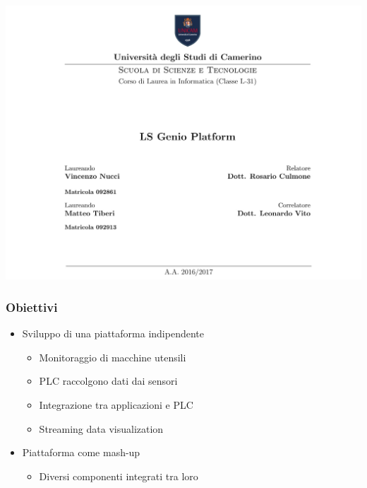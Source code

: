\documentclass{beamer}
\date{}
\begin{document}
	
	\begin{frame}
	\centering
	\includegraphics[scale=0.25]{images/frontespizio-beamer.png}\par
\end{frame}

\begin{frame}
\frametitle{Obiettivi}
\begin{itemize}
	\item Sviluppo di una piattaforma indipendente
	\begin{itemize}
		\item Monitoraggio di macchine utensili
		\item PLC raccolgono dati dai sensori
		\item Integrazione tra applicazioni e PLC
		\item Streaming data visualization
	\end{itemize}
	\item Piattaforma come mash-up
	\begin{itemize}
		\item Diversi componenti integrati tra loro
	\end{itemize}
\end{itemize}
\end{frame}
\end{document}
